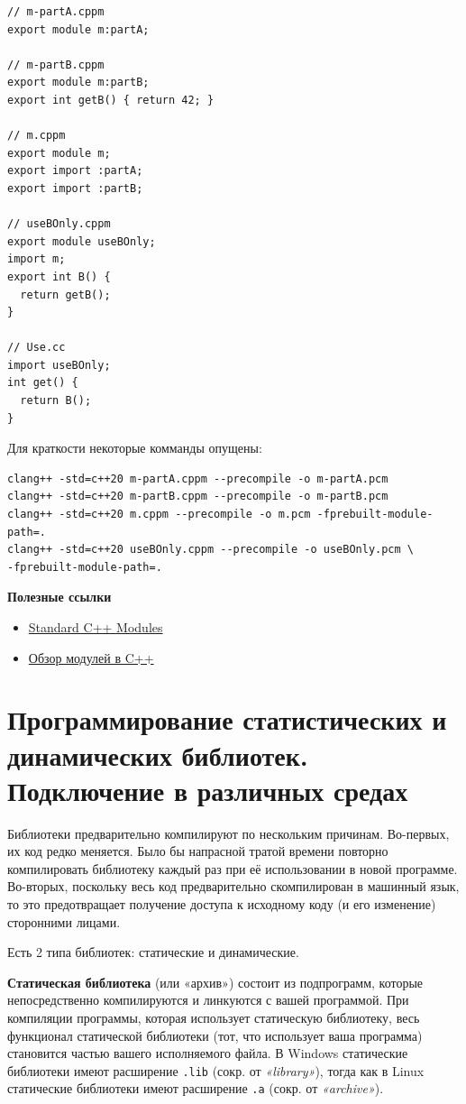 \begin{verbatim}
// m-partA.cppm
export module m:partA;

// m-partB.cppm
export module m:partB;
export int getB() { return 42; }

// m.cppm
export module m;
export import :partA;
export import :partB;

// useBOnly.cppm
export module useBOnly;
import m;
export int B() {
  return getB();
}

// Use.cc
import useBOnly;
int get() {
  return B();
}
\end{verbatim}

Для краткости некоторые комманды опущены:
\begin{verbatim}
clang++ -std=c++20 m-partA.cppm --precompile -o m-partA.pcm
clang++ -std=c++20 m-partB.cppm --precompile -o m-partB.pcm
clang++ -std=c++20 m.cppm --precompile -o m.pcm -fprebuilt-module-path=.
clang++ -std=c++20 useBOnly.cppm --precompile -o useBOnly.pcm \
-fprebuilt-module-path=.
\end{verbatim}

\textbf{Полезные ссылки}
\begin{itemize}
    \item \href{https://clang.llvm.org/docs/StandardCPlusPlusModules.html}{Standard C++ Modules}
    \item \href{https://learn.microsoft.com/ru-ru/cpp/cpp/modules-cpp?view=msvc-170}{Обзор модулей в C++}
\end{itemize}

\section{Программирование статистических и динамических библиотек.  Подключение в различных средах}

Библиотеки предварительно компилируют по нескольким причинам. Во-первых, их код редко меняется. Было бы напрасной тратой времени повторно компилировать библиотеку каждый раз при её использовании в новой программе. Во-вторых, поскольку весь код предварительно скомпилирован в машинный язык, то это предотвращает получение доступа к исходному коду (и его изменение) сторонними лицами.

Есть 2 типа библиотек: статические и динамические.

\textbf{Статическая библиотека} (или «архив») состоит из подпрограмм, которые непосредственно компилируются и линкуются с вашей программой. При компиляции программы, которая использует статическую библиотеку, весь функционал статической библиотеки (тот, что использует ваша программа) становится частью вашего исполняемого файла. В Windows статические библиотеки имеют расширение \texttt{.lib} (сокр. от \textit{«library»}), тогда как в Linux статические библиотеки имеют расширение \texttt{.a} (сокр. от \textit{«archive»}).

